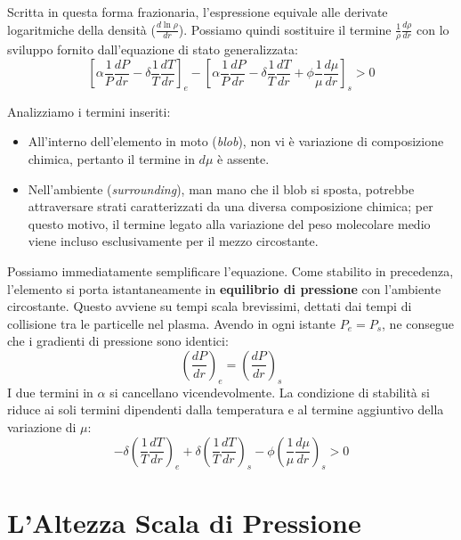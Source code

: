 Scritta in questa forma frazionaria, l'espressione equivale alle derivate logaritmiche della densità ($\frac{d\ln\rho}{dr}$). Possiamo quindi sostituire il termine $\frac{1}{\rho} \frac{d\rho}{dr}$ con lo sviluppo fornito dall'equazione di stato generalizzata:
\begin{equation}
\left[ \alpha \frac{1}{P} \frac{dP}{dr} - \delta \frac{1}{T} \frac{dT}{dr} \right]_e - \left[ \alpha \frac{1}{P} \frac{dP}{dr} - \delta \frac{1}{T} \frac{dT}{dr} + \phi \frac{1}{\mu} \frac{d\mu}{dr} \right]_s > 0
\end{equation}

Analizziamo i termini inseriti:
\begin{itemize}
\item All'interno dell'elemento in moto (\textit{blob}), non vi è variazione di composizione chimica, pertanto il termine in $d\mu$ è assente.
\item Nell'ambiente (\textit{surrounding}), man mano che il blob si sposta, potrebbe attraversare strati caratterizzati da una diversa composizione chimica; per questo motivo, il termine legato alla variazione del peso molecolare medio viene incluso esclusivamente per il mezzo circostante.
\end{itemize}

Possiamo immediatamente semplificare l'equazione. Come stabilito in precedenza, l'elemento si porta istantaneamente in \textbf{equilibrio di pressione} con l'ambiente circostante. Questo avviene su tempi scala brevissimi, dettati dai tempi di collisione tra le particelle nel plasma. Avendo in ogni istante $P_e = P_s$, ne consegue che i gradienti di pressione sono identici:
\begin{equation}
\left( \frac{dP}{dr} \right)_e = \left( \frac{dP}{dr} \right)_s
\end{equation}
I due termini in $\alpha$ si cancellano vicendevolmente. La condizione di stabilità si riduce ai soli termini dipendenti dalla temperatura e al termine aggiuntivo della variazione di $\mu$:
\begin{equation}
- \delta \left( \frac{1}{T} \frac{dT}{dr} \right)_e + \delta \left( \frac{1}{T} \frac{dT}{dr} \right)_s - \phi \left( \frac{1}{\mu} \frac{d\mu}{dr} \right)_s > 0
\end{equation}

\section{L'Altezza Scala di Pressione}

